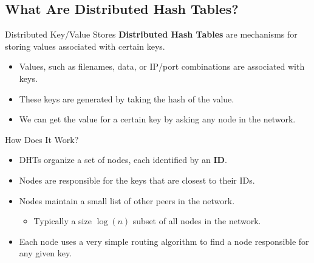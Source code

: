 \documentclass[11pt]{beamer}
\begin{document}
\subsection{What Are Distributed Hash Tables?}

\begin{frame}{Distributed Key/Value Stores}
	\textbf{Distributed Hash Tables }are mechanisms for storing values associated with certain keys.
	\begin{itemize}
		\item Values, such as filenames, data, or IP/port combinations are associated with keys.
		\item These keys are generated by taking the hash of the value.
		\item We can get the value for a certain key by asking any node in the network.
	\end{itemize}
\end{frame}





\begin{frame}{How Does It Work?}
	
	\begin{itemize}
		\item DHTs organize a set of nodes, each identified by an \textbf{ID}. 
		\item Nodes are responsible for the keys that are closest to their IDs.
		\item Nodes maintain a small list of other peers in the network.
		\begin{itemize}
			\item Typically a size $ \log(n)$ subset of all nodes in the network.
		\end{itemize}
		\item Each node uses a very simple routing algorithm to find a node responsible for any given key.  %
	\end{itemize}
\end{frame}
\end{document}
